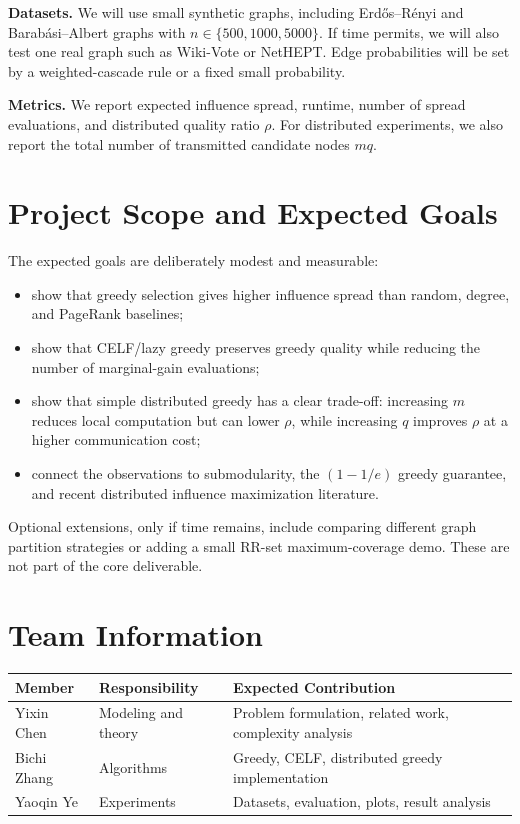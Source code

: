 \documentclass[10pt]{article}
\begin{document}
\textbf{Datasets.} We will use small synthetic graphs, including Erd\H{o}s--R\'{e}nyi and Barab\'{a}si--Albert graphs with $n\in\{500,1000,5000\}$. If time permits, we will also test one real graph such as Wiki-Vote or NetHEPT. Edge probabilities will be set by a weighted-cascade rule or a fixed small probability.

\textbf{Metrics.} We report expected influence spread, runtime, number of spread evaluations, and distributed quality ratio $\rho$. For distributed experiments, we also report the total number of transmitted candidate nodes $mq$.

\section{Project Scope and Expected Goals}
The expected goals are deliberately modest and measurable:
\begin{itemize}
\item show that greedy selection gives higher influence spread than random, degree, and PageRank baselines;
\item show that CELF/lazy greedy preserves greedy quality while reducing the number of marginal-gain evaluations;
\item show that simple distributed greedy has a clear trade-off: increasing $m$ reduces local computation but can lower $\rho$, while increasing $q$ improves $\rho$ at a higher communication cost;
\item connect the observations to submodularity, the $(1-1/e)$ greedy guarantee, and recent distributed influence maximization literature.
\end{itemize}

Optional extensions, only if time remains, include comparing different graph partition strategies or adding a small RR-set maximum-coverage demo. These are not part of the core deliverable.

\section{Team Information}
\begin{center}
\begin{tabular}{lll}
\toprule
Member & Responsibility & Expected Contribution \\
\midrule
Yixin Chen & Modeling and theory & Problem formulation, related work, complexity analysis \\
Bichi Zhang & Algorithms & Greedy, CELF, distributed greedy implementation \\
Yaoqin Ye & Experiments & Datasets, evaluation, plots, result analysis \\
\bottomrule
\end{tabular}
\end{center}
\end{document}
